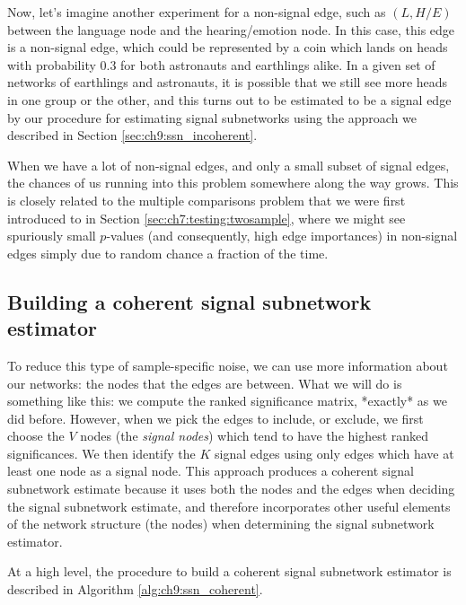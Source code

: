 Now, let's imagine another experiment for a non-signal edge, such as $(L, H/E)$ between the language node and the hearing/emotion node. In this case, this edge is a non-signal edge, which could be represented by a coin which lands on heads with probability $0.3$ for both astronauts and earthlings alike. In a given set of networks of earthlings and astronauts, it is possible that we still see more heads in one group or the other, and this turns out to be estimated to be a signal edge by our procedure for estimating signal subnetworks using the approach we described in Section \ref{sec:ch9:ssn_incoherent}. 

When we have a lot of non-signal edges, and only a small subset of signal edges, the chances of us running into this problem somewhere along the way grows. This is closely related to the multiple comparisons problem that we were first introduced to in Section \ref{sec:ch7:testing:twosample}, where we might see spuriously small $p$-values (and consequently, high edge importances) in non-signal edges simply due to random chance a fraction of the time. 



\subsection{Building a coherent signal subnetwork estimator}

To reduce this type of sample-specific noise, we can use more information about our networks: the nodes that the edges are between. What we will do is something like this: we compute the ranked significance matrix, *exactly* as we did before. However, when we pick the edges to include, or exclude, we first choose the $V$ nodes (the \textit{signal nodes}) which tend to have the highest ranked significances. We then identify the $K$ signal edges using only edges which have at least one node as a signal node. This approach produces a coherent signal subnetwork estimate because it uses both the nodes and the edges when deciding the signal subnetwork estimate, and therefore incorporates other useful elements of the network structure (the nodes) when determining the signal subnetwork estimator. 

At a high level, the procedure to build a coherent signal subnetwork estimator is described in Algorithm \ref{alg:ch9:ssn_coherent}.


